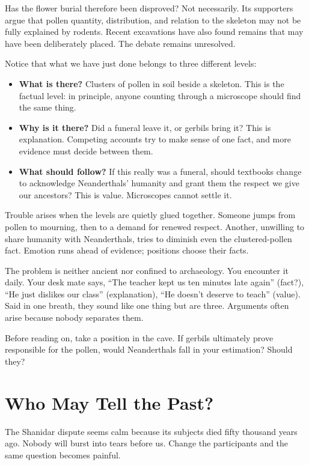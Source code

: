 Has the flower burial therefore been disproved? Not necessarily. Its supporters argue that pollen quantity, distribution, and relation to the skeleton may not be fully explained by rodents. Recent excavations have also found remains that may have been deliberately placed. The debate remains unresolved.

Notice that what we have just done belongs to three different levels:

\begin{itemize}
\item \textbf{What is there?} Clusters of pollen in soil beside a skeleton. This is the factual level: in principle, anyone counting through a microscope should find the same thing.
\item \textbf{Why is it there?} Did a funeral leave it, or gerbils bring it? This is explanation. Competing accounts try to make sense of one fact, and more evidence must decide between them.
\item \textbf{What should follow?} If this really was a funeral, should textbooks change to acknowledge Neanderthals' humanity and grant them the respect we give our ancestors? This is value. Microscopes cannot settle it.
\end{itemize}
Trouble arises when the levels are quietly glued together. Someone jumps from pollen to mourning, then to a demand for renewed respect. Another, unwilling to share humanity with Neanderthals, tries to diminish even the clustered-pollen fact. Emotion runs ahead of evidence; positions choose their facts.

The problem is neither ancient nor confined to archaeology. You encounter it daily. Your desk mate says, ``The teacher kept us ten minutes late again'' (fact?), ``He just dislikes our class'' (explanation), ``He doesn't deserve to teach'' (value). Said in one breath, they sound like one thing but are three. Arguments often arise because nobody separates them.

Before reading on, take a position in the cave. If gerbils ultimately prove responsible for the pollen, would Neanderthals fall in your estimation? Should they?

\section{Who May Tell the Past?}
The Shanidar dispute seems calm because its subjects died fifty thousand years ago. Nobody will burst into tears before us. Change the participants and the same question becomes painful.

